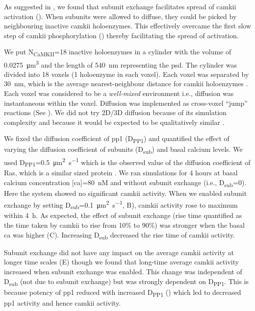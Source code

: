 \documentclass[9pt,lineno,doublespacing]{elife}
\newcommand\SUB[2]{#1\textsubscript{#2}}
\begin{document}
As suggested in \citep{stratton_activation-triggered_2014}, we found that
subunit exchange facilitates spread of \gls{camkii} activation
(). When subunits were allowed to
diffuse, they could be picked by neighbouring inactive \gls{camkii} holoenzymes.
This effectively overcame the first slow step of \gls{camkii} phosphorylation
() thereby facilitating the spread of activation.

We put \SUB{N}{CaMKII}=18 inactive holoenzymes in a cylinder with the volume of
\SI{0.0275}{\cubic\micro\meter} and the length of \SI{540}{\nano\meter}
representing the \gls{psd}. The cylinder was divided into 18 voxels (1
holoenzyme in each voxel).  Each voxel was separated by \SI{30}{\nano\meter},
which is the average nearest-neighbour distance for \gls{camkii} holoenzymes
\citep{feng_quantitative_2011}.  Each voxel was considered to be a
\emph{well-mixed} environment i.e., diffusion was instantaneous within the
voxel. Diffusion was implemented as cross-voxel ``jump'' reactions (See
).  We did not try 2D/3D diffusion because of
its simulation complexity and because it would be expected to be qualitatively
similar \citep{fange_stochastic_2010}.

We fixed the diffusion coefficient of \gls{pp1} (\SUB{D}{PP1}) and quantified
the effect of varying the diffusion coefficient of subunits (\SUB{D}{sub}) and
basal calcium levels. We used
\SUB{D}{PP1}=\SI{0.5}{\micro\meter\squared\per\second} which is the observed
value of the diffusion coefficient of Ras, which is a similar sized protein
\citep{harvey_spread_2008}. We ran simulations for 4 hours at basal calcium
concentration [\gls{ca}]=\SI{80}{\nano M} and without subunit exchange (i.e.,
\SUB{D}{sub}=0). Here the system showed no significant \gls{camkii} activity.
When we enabled subunit exchange by setting
\SUB{D}{sub}=\SI{0.1}{\micro\meter\squared\per\second},
B), \gls{camkii} activity rose to
maximum within \SI{4}{\hour}. As expected, the effect of subunit exchange (rise
time quantified as the time taken by \gls{camkii} to rise from 10\% to 90\%) was
stronger when the basal \gls{ca} was higher
(C). Increasing \SUB{D}{sub} decreased
the rise time of \gls{camkii} activity.

Subunit exchange did not have any impact on the average \gls{camkii} activity at
longer time scales (E) though we found
that long-time average \gls{camkii} activity increased when subunit exchange was
enabled. This change was independent of \SUB{D}{sub} (not due to subunit
exchange) but was strongly dependent on \SUB{D}{PP1}. This is because
potency of \gls{pp1} reduced with increased \SUB{D}{PP1}
() which led to decreased \gls{pp1}
activity and hence \gls{camkii} activity.
\end{document}
